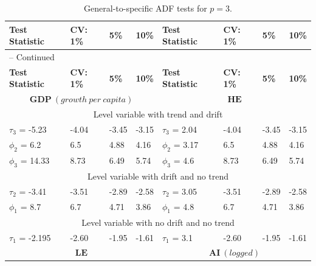 \documentclass[11pt,preprint, authoryear]{elsarticle}
\numberwithin{equation}{section}
\numberwithin{figure}{section}
\numberwithin{table}{section}
\begin{document}
\begin{small}
\begin{longtable}{|llll|||llll|}
\caption{General-to-specific ADF tests for $p=3$. \label{steady}}\\%
\hline%
\multicolumn{1}{|l}{\textbf{Test Statistic}} &
\multicolumn{1}{l}{\textbf{CV: 1\%}} &
\multicolumn{1}{l}{\textbf{5\%}} &
\multicolumn{1}{l}{\textbf{10\%}}&
\multicolumn{1}{l}{\textbf{Test Statistic}} &
\multicolumn{1}{l}{\textbf{CV: 1\%}} &
\multicolumn{1}{l}{\textbf{5\%}} &
\multicolumn{1}{l|}{\textbf{10\%}}\\%
\hline\hline%
\endfirsthead
\multicolumn{4}{l}{{\tablename} \thetable{} -- Continued}\\%
\hline%
\hline%
\multicolumn{1}{|l}{\textbf{Test Statistic}} &
\multicolumn{1}{l}{\textbf{CV: 1\%}} &
\multicolumn{1}{l}{\textbf{5\%}} &
\multicolumn{1}{l}{\textbf{10\%}}&
\multicolumn{1}{l}{\textbf{Test Statistic}} &
\multicolumn{1}{l}{\textbf{CV: 1\%}} &
\multicolumn{1}{l}{\textbf{5\%}} &
\multicolumn{1}{l|}{\textbf{10\%}}\\%
\hline\hline%
\endhead
 \multicolumn{4}{|c|||}{$\textbf{GDP} \ (growth \ per \ capita)$} &  \multicolumn{4}{c|}{$\textbf{HE}$} \\
\hline
\multicolumn{8}{|c|}{Level variable with trend and drift}\\
\hline
  $\tau_3$ = -5.23  &  -4.04   & -3.45   & -3.15  &  $\tau_3$ = 2.04 &  -4.04   & -3.45   & -3.15  \\
  $\phi_2$ = 6.2    &   6.5    & 4.88    &  4.16  &  $\phi_2$ = 3.17 &   6.5    & 4.88    &  4.16  \\
  $\phi_3$ = 14.33   &   8.73   & 6.49    &  5.74  &  $\phi_3$ = 4.6 &   8.73   & 6.49    &  5.74 \\
\hline
  \multicolumn{8}{|c|}{Level variable with drift and no trend}\\
\hline
  $\tau_2$ = -3.41 & -3.51  & -2.89  & -2.58   & $\tau_2$ = 3.05 & -3.51  & -2.89  & -2.58 \\
  $\phi_1$ = 8.7 &    6.7       & 4.71     & 3.86      &   $\phi_1$ = 4.8 &    6.7       & 4.71     & 3.86  \\
\hline
  \multicolumn{8}{|c|}{Level variable with no drift and no trend}\\
\hline
  $\tau_1$ = -2.195  & -2.60  & -1.95 & -1.61 & $\tau_1$ = 3.1 & -2.60  & -1.95 & -1.61    \\
\hline
 \multicolumn{4}{|c|||}{$\textbf{LE}$} &  \multicolumn{4}{c|}{$\textbf{AI} \ (logged)$} \\

\end{longtable}
\end{small}
\end{document}

